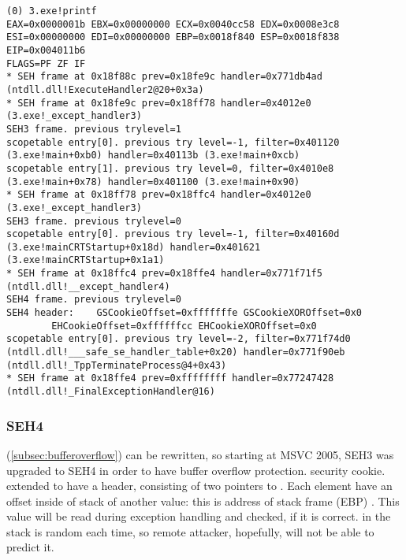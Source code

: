 \begin{lstlisting}[caption=tracer.exe output]
(0) 3.exe!printf
EAX=0x0000001b EBX=0x00000000 ECX=0x0040cc58 EDX=0x0008e3c8
ESI=0x00000000 EDI=0x00000000 EBP=0x0018f840 ESP=0x0018f838
EIP=0x004011b6
FLAGS=PF ZF IF
* SEH frame at 0x18f88c prev=0x18fe9c handler=0x771db4ad (ntdll.dll!ExecuteHandler2@20+0x3a)
* SEH frame at 0x18fe9c prev=0x18ff78 handler=0x4012e0 (3.exe!_except_handler3)
SEH3 frame. previous trylevel=1
scopetable entry[0]. previous try level=-1, filter=0x401120 (3.exe!main+0xb0) handler=0x40113b (3.exe!main+0xcb)
scopetable entry[1]. previous try level=0, filter=0x4010e8 (3.exe!main+0x78) handler=0x401100 (3.exe!main+0x90)
* SEH frame at 0x18ff78 prev=0x18ffc4 handler=0x4012e0 (3.exe!_except_handler3)
SEH3 frame. previous trylevel=0
scopetable entry[0]. previous try level=-1, filter=0x40160d (3.exe!mainCRTStartup+0x18d) handler=0x401621 (3.exe!mainCRTStartup+0x1a1)
* SEH frame at 0x18ffc4 prev=0x18ffe4 handler=0x771f71f5 (ntdll.dll!__except_handler4)
SEH4 frame. previous trylevel=0
SEH4 header:	GSCookieOffset=0xfffffffe GSCookieXOROffset=0x0
		EHCookieOffset=0xffffffcc EHCookieXOROffset=0x0
scopetable entry[0]. previous try level=-2, filter=0x771f74d0 (ntdll.dll!___safe_se_handler_table+0x20) handler=0x771f90eb (ntdll.dll!_TppTerminateProcess@4+0x43)
* SEH frame at 0x18ffe4 prev=0xffffffff handler=0x77247428 (ntdll.dll!_FinalExceptionHandler@16)
\end{lstlisting}

\subsubsection{SEH4}

\index{\BufferOverflow}
 (\ref{subsec:bufferoverflow})
  
{can be rewritten, so starting at} MSVC 2005, SEH3 
{was upgraded to SEH4 in order to have buffer overflow protection}.
    
 \gls{security cookie}.
 
{extended to have a header, consisting of two pointers to} .
{Each element have an offset inside of stack of another value: 
this is address of stack frame (EBP)}   
 .
{This value will be read during exception handling and checked, if it is correct}.
 
{in the stack is random each time, so remote attacker, hopefully, will not be able to predict it}.

